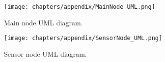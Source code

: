 \addtolength{\topmargin}{-.875in}
\begin{figure}[h!]
\centering
\texttt{[image: chapters/appendix/MainNode\_UML.png]}
\caption{Main node UML diagram.}
\label{fig:mainuml}
\end{figure}
\clearpage
\addtolength{\topmargin}{-.875in}
\begin{figure}[h!]
\centering
\texttt{[image: chapters/appendix/SensorNode\_UML.png]}
\caption{Sensor node UML diagram.}
\label{fig:sensoruml}
\end{figure}
\addtolength{\topmargin}{.875in} %
\addtolength{\topmargin}{.875in} %